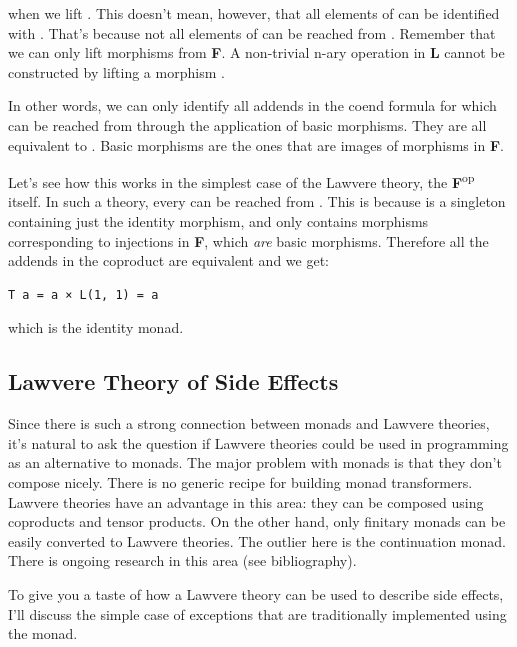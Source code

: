 when we lift . This doesn't
mean, however, that all elements of  can be
identified with . That's because not all elements
of  can be reached from . Remember
that we can only lift morphisms from \textbf{F}. A non-trivial n-ary
operation in \textbf{L} cannot be constructed by lifting a morphism
.

In other words, we can only identify all addends in the coend formula
for which  can be reached from 
through the application of basic morphisms. They are all equivalent to
. Basic morphisms are the ones that are images of
morphisms in \textbf{F}.

Let's see how this works in the simplest case of the Lawvere theory, the
\textbf{F}\textsuperscript{op} itself. In such a theory, every
 can be reached from . This is because
 is a singleton containing just the identity morphism,
and  only contains morphisms corresponding to
injections  in \textbf{F}, which \emph{are}
basic morphisms. Therefore all the addends in the coproduct are
equivalent and we get:

\begin{verbatim}
T a = a × L(1, 1) = a
\end{verbatim}

which is the identity monad.

\subsection{Lawvere Theory of Side
Effects}\label{lawvere-theory-of-side-effects}

Since there is such a strong connection between monads and Lawvere
theories, it's natural to ask the question if Lawvere theories could be
used in programming as an alternative to monads. The major problem with
monads is that they don't compose nicely. There is no generic recipe for
building monad transformers. Lawvere theories have an advantage in this
area: they can be composed using coproducts and tensor products. On the
other hand, only finitary monads can be easily converted to Lawvere
theories. The outlier here is the continuation monad. There is ongoing
research in this area (see bibliography).

To give you a taste of how a Lawvere theory can be used to describe side
effects, I'll discuss the simple case of exceptions that are
traditionally implemented using the  monad.

